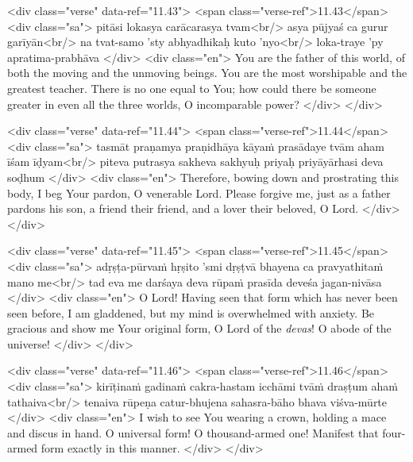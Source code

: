 \begin{html}
<div class="verse" data-ref="11.43">
  <span class="verse-ref">11.43</span>
  <div class="sa">
    pitāsi lokasya carācarasya tvam<br/>
    asya pūjyaś ca gurur garīyān<br/>
    na tvat-samo ’sty abhyadhikaḥ kuto ’nyo<br/>
    loka-traye ’py apratima-prabhāva
  </div>
  <div class="en">
    You are the father of this world, of both the moving and the unmoving beings. You are the most worshipable and the greatest teacher. There is no one equal to You; how could there be someone greater in even all the three worlds, O incomparable power?
  </div>
</div>
\end{html}



\begin{html}
<div class="verse" data-ref="11.44">
  <span class="verse-ref">11.44</span>
  <div class="sa">
    tasmāt praṇamya praṇidhāya kāyaṁ prasādaye tvām aham īśam īḍyam<br/>
    piteva putrasya sakheva sakhyuḥ priyaḥ priyāyārhasi deva soḍhum
  </div>
  <div class="en">
    Therefore, bowing down and prostrating this body, I beg Your pardon, O venerable Lord. Please forgive me, just as a father pardons his son, a friend their friend, and a lover their beloved, O Lord.
  </div>
</div>
\end{html}



\begin{html}
<div class="verse" data-ref="11.45">
  <span class="verse-ref">11.45</span>
  <div class="sa">
    adṛṣṭa-pūrvaṁ hṛṣito ’smi dṛṣṭvā bhayena ca pravyathitaṁ mano me<br/>
    tad eva me darśaya deva rūpaṁ prasīda deveśa jagan-nivāsa
  </div>
  <div class="en">
    O Lord! Having seen that form which has never been seen before, I am gladdened, but my mind is overwhelmed with anxiety. Be gracious and show me Your original form, O Lord of the \textit{devas}! O abode of the universe!
  </div>
</div>
\end{html}



\begin{html}
<div class="verse" data-ref="11.46">
  <span class="verse-ref">11.46</span>
  <div class="sa">
    kirīṭinaṁ gadinaṁ cakra-hastam icchāmi tvāṁ draṣṭum ahaṁ tathaiva<br/>
    tenaiva rūpeṇa catur-bhujena sahasra-bāho bhava viśva-mūrte
  </div>
  <div class="en">
    I wish to see You wearing a crown, holding a mace and discus in hand. O universal form! O thousand-armed one! Manifest that four-armed form exactly in this manner.
  </div>
</div>
\end{html}


